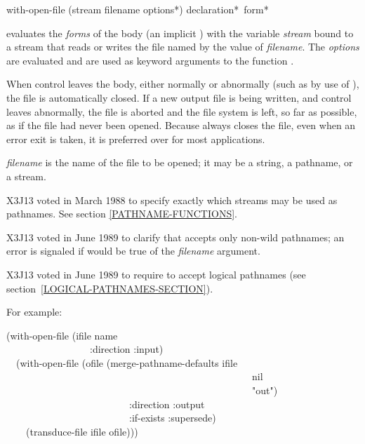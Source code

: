 \begin{defmac}
with-open-file (stream filename {options}*)
               {declaration}* {\,form}*

evaluates the {\it forms} of the body (an implicit ) with the variable
{\it stream} bound to a stream that reads or writes the file named by the
value of {\it filename}.
The {\it options} are evaluated and are used as keyword arguments to
the function .

When control leaves the body, either normally or abnormally (such as by
use of ), the file is automatically closed.  If a new
output file is being written, and control leaves abnormally, the file is
aborted and the file system is left, so far as possible, as if the file
had never been opened.  Because  always closes the
file, even when an error exit is taken, it is preferred over  for
most applications.

{\it filename} is the name of the file to be opened; it may be a string,
a pathname, or a stream.

\begin{new}
X3J13 voted in March 1988
to specify exactly which streams may be used as pathnames.
See section \ref{PATHNAME-FUNCTIONS}.
\end{new}

\begin{newer}
X3J13 voted in June 1989 
to clarify that  accepts only non-wild pathnames;
an error is signaled if  would be true of
the {\it filename} argument.
\end{newer}

\begin{newer}
X3J13 voted in June 1989  to require 
to accept logical pathnames (see section~\ref{LOGICAL-PATHNAMES-SECTION}).
\end{newer}


For example:
\begin{lisp}
(with-open-file (ifile name \\
~~~~~~~~~~~~~~~~~:direction :input) \\
~~(with-open-file (ofile (merge-pathname-defaults ifile \\
~~~~~~~~~~~~~~~~~~~~~~~~~~~~~~~~~~~~~~~~~~~~~~~~~~nil \\
~~~~~~~~~~~~~~~~~~~~~~~~~~~~~~~~~~~~~~~~~~~~~~~~~~"out") \\
~~~~~~~~~~~~~~~~~~~~~~~~~:direction :output \\
~~~~~~~~~~~~~~~~~~~~~~~~~:if-exists :supersede) \\
~~~~(transduce-file ifile ofile)))
\end{lisp}


\end{defmac}
